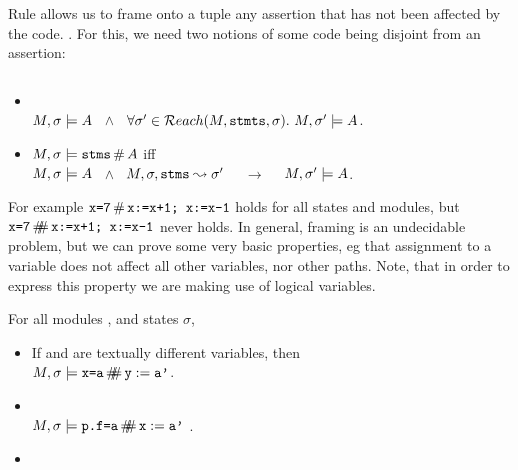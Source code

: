 Rule   allows us to frame onto a tuple any assertion that has not been affected by the code. . For this, we  need two notions of some code being disjoint from an assertion:

\begin{definition}[Disjointness]\label{defn:disjointness}
$ $ \\
\begin{itemize}
\item
{}\\
$M,\sigma  \models A$ \  $\wedge$ \  $\forall \sigma'\in{\mathcal{R}each}(M,{{\textrm{\ttfamily{stmts}}}},\sigma). \ M,\sigma'  \models A$.

\item
$M,\sigma \models {\ensuremath{\textrm{\ttfamily{stms}}}} \,\#\, A$ iff \\
$M,\sigma  \models A$ \  $\wedge$ \  $M,\sigma, {\textrm{\ttfamily{stms}}} \leadsto \sigma'$ \ \ $\rightarrow$ \ \ $M,\sigma'  \models A$.
\end{itemize}
\end{definition}

For example ${\textrm{\ttfamily{x=7}}}\,\#\,{\textrm{\ttfamily{x:=x+1; x:=x-1}}}$ holds for all states and modules,  but  ${\textrm{\ttfamily{x=7}}}\,\#\!\!\!\#\,{\textrm{\ttfamily{x:=x+1; x:=x-1}}}$ never holds. In general, framing is an undecidable problem, but we can prove some very basic properties, eg that assignment to a variable does not affect all other variables, nor other paths. Note, that in order to express this property we are making use of logical variables.

\begin{lemma}
For all modules \M, and states $\sigma$,

\begin{itemize}
\item
If  and  are textually different variables, then\\
$M,\sigma \models {\ensuremath{\textrm{\ttfamily{x=a}}}}\,\#\!\!\!\#\, {\textrm{\ttfamily{y}}}:={\textrm{\ttfamily{a'}}}$.
\item
{} \\
$M,\sigma \models {\ensuremath{\textrm{\ttfamily{p.f=a}}}}\,\#\!\!\!\#\, {\textrm{\ttfamily{x}}}:={\textrm{\ttfamily{a'}}}$ . 
\item
{}
\end{itemize}
\end{lemma}

